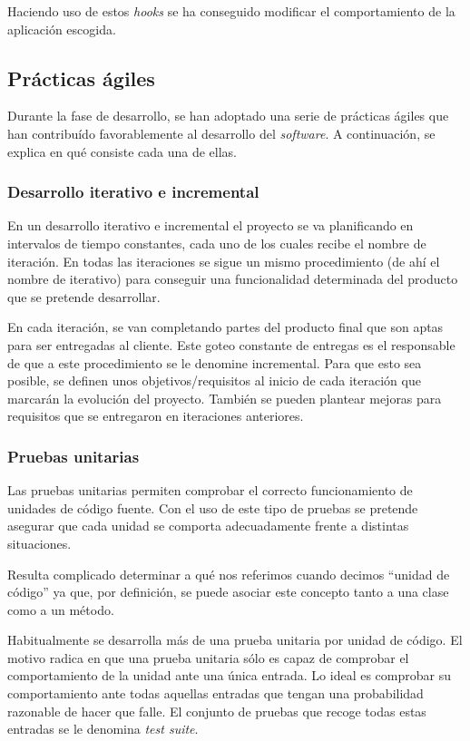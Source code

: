 
Haciendo uso de estos \emph{hooks} se ha conseguido modificar el comportamiento
de la aplicación escogida.

\subsection{Prácticas ágiles}

Durante la fase de desarrollo, se han adoptado una serie de prácticas ágiles que han
contribuído favorablemente al desarrollo del \emph{software}. A
continuación, se explica en qué consiste cada una de ellas.

\subsubsection{Desarrollo iterativo e incremental}

En un desarrollo iterativo e incremental el proyecto se va planificando
en intervalos de tiempo constantes, cada uno de los cuales recibe el
nombre de iteración. En todas las iteraciones se sigue un mismo
procedimiento (de ahí el nombre de iterativo) para conseguir una
funcionalidad determinada del producto que se pretende desarrollar.

En cada iteración, se van completando partes del producto final que son
aptas para ser entregadas al cliente. Este goteo constante de entregas
es el responsable de que a este procedimiento se le denomine
incremental. Para que esto sea posible, se definen unos
objetivos/requisitos al inicio de cada iteración que marcarán la
evolución del proyecto. También se pueden plantear mejoras para
requisitos que se entregaron en iteraciones anteriores.

\subsubsection{Pruebas unitarias}

Las pruebas unitarias permiten comprobar el correcto funcionamiento de
unidades de código fuente. Con el uso de este tipo de pruebas se
pretende asegurar que cada unidad se comporta adecuadamente frente a
distintas situaciones. 

Resulta complicado determinar a qué nos referimos
cuando decimos ``unidad de código'' ya que, por definición, se puede asociar
este concepto tanto a una clase como a un método.

Habitualmente se desarrolla más de una prueba unitaria por unidad de
código. El motivo radica en que una prueba unitaria sólo es capaz de
comprobar el comportamiento de la unidad ante una única entrada. Lo
ideal es comprobar su comportamiento ante todas aquellas entradas que
tengan una probabilidad razonable de hacer que falle. El conjunto de
pruebas que recoge todas estas entradas se le denomina \emph{test
suite}.

